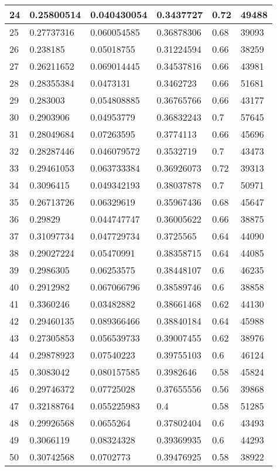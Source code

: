 \begin{longtable}{|l|l|l|l|l|l|}
24 & 0.25800514 & 0.040430054 & 0.3437727 & 0.72 & 49488 \\ \hline 
25 & 0.27737316 & 0.060054585 & 0.36878306 & 0.68 & 39093 \\ \hline 
26 & 0.238185 & 0.05018755 & 0.31224594 & 0.66 & 38259 \\ \hline 
27 & 0.26211652 & 0.069014445 & 0.34537816 & 0.66 & 43981 \\ \hline 
28 & 0.28355384 & 0.0473131 & 0.3462723 & 0.66 & 51681 \\ \hline 
29 & 0.283003 & 0.054808885 & 0.36765766 & 0.66 & 43177 \\ \hline 
30 & 0.2903906 & 0.04953779 & 0.36832243 & 0.7 & 57645 \\ \hline 
31 & 0.28049684 & 0.07263595 & 0.3774113 & 0.66 & 45696 \\ \hline 
32 & 0.28287446 & 0.046079572 & 0.3532719 & 0.7 & 43473 \\ \hline 
33 & 0.29461053 & 0.063733384 & 0.36926073 & 0.72 & 39313 \\ \hline 
34 & 0.3096415 & 0.049342193 & 0.38037878 & 0.7 & 50971 \\ \hline 
35 & 0.26713726 & 0.06329619 & 0.35967436 & 0.68 & 45647 \\ \hline 
36 & 0.29829 & 0.044747747 & 0.36005622 & 0.66 & 38875 \\ \hline 
37 & 0.31097734 & 0.047729734 & 0.3725565 & 0.64 & 44090 \\ \hline 
38 & 0.29027224 & 0.05470991 & 0.38358715 & 0.64 & 44085 \\ \hline 
39 & 0.2986305 & 0.06253575 & 0.38448107 & 0.6 & 46235 \\ \hline 
40 & 0.2912982 & 0.067066796 & 0.38589746 & 0.6 & 38858 \\ \hline 
41 & 0.3360246 & 0.03482882 & 0.38661468 & 0.62 & 44130 \\ \hline 
42 & 0.29460135 & 0.089366466 & 0.38840184 & 0.64 & 45988 \\ \hline 
43 & 0.27305853 & 0.056539733 & 0.39007455 & 0.62 & 38976 \\ \hline 
44 & 0.29878923 & 0.07540223 & 0.39755103 & 0.6 & 46124 \\ \hline 
45 & 0.3083042 & 0.080157585 & 0.3982646 & 0.58 & 45824 \\ \hline 
46 & 0.29746372 & 0.07725028 & 0.37655556 & 0.56 & 39868 \\ \hline 
47 & 0.32188764 & 0.055225983 & 0.4 & 0.58 & 51285 \\ \hline 
48 & 0.29926568 & 0.0655264 & 0.37802404 & 0.6 & 43493 \\ \hline 
49 & 0.3066119 & 0.08324328 & 0.39369935 & 0.6 & 44293 \\ \hline 
50 & 0.30742568 & 0.0702773 & 0.39476925 & 0.58 & 38922 \\ \hline 
\end{longtable}